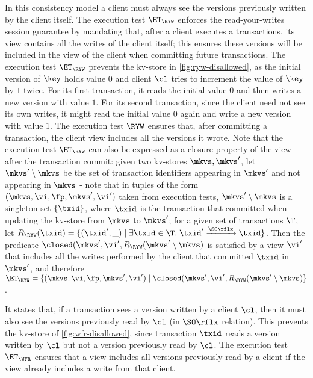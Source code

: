 In this consistency model a client must always see the versions previously written by the client itself. 
The execution test $\ET_{\RYW}$ enforces the read-your-writes session guarantee by 
mandating that, after a client executes a transactions, its view contains all the writes of the client 
itself; this ensures these versions will be included in the view of the client when committing future 
transactions.
The execution test $\ET_{\RYW}$ prevents the kv-store in \cref{fig:ryw-disallowed}, 
as the initial version of $\key$ holds value $0$ 
and client $\cl$ tries to increment the value of $\key$ by $1$ twice.  
For its first transaction, it reads the initial value $0$ and then writes a new version with value $1$. 
For its second transaction, since the client need not see its own writes, 
it might read the initial value $0$ again and write a new version with value $1$.
The execution test $\RYW$ ensures that, after committing a transaction, 
the client view includes all the versions it wrote.  
Note that the execution test $\ET_{\RYW}$ can also be expressed 
as a closure property of the view after the transaction commit: given 
two kv-stores $\mkvs, \mkvs'$, let  
$\mkvs' \setminus \mkvs$ be the set of transaction identifiers appearing 
in $\mkvs'$ and not appearing in $\mkvs$ - note that in tuples of the form 
$(\mkvs, \vi, \fp, \mkvs', \vi')$ taken from execution tests, $\mkvs' \setminus \mkvs$ 
is a singleton set $\{\txid\}$, where $\txid$ is the transaction that committed 
when updating the kv-store from $\mkvs$ to $\mkvs'$; for a given 
set of transactions $\T$, let $R_{\RYW}(\txid) = \{(\txid', \_) \mid \exists \txid \in \T.\; \txid' \xrightarrow{\SO\rflx} \txid\}$. 
Then the predicate $\closed(\mkvs', \vi', R_{\RYW}(\mkvs' \setminus \mkvs)$ is satisfied by a 
view $\vi'$ that includes all the writes performed by the client that committed $\txid$ in $\mkvs'$, 
and therefore $\ET_{\RYW} = \{(\mkvs, \vi, \fp, \mkvs', \vi') \mid \closed(\mkvs', \vi', R_{\RYW}(\mkvs' \setminus \mkvs)\}$.
 


It states that, if a transaction sees a version written by a
client $\cl$, then it must also see the versions previously read by $\cl$ (in $\SO\rflx$ relation).
This prevents the kv-store of \cref{fig:wfr-disallowed},
since transaction $\txid$ reads a version written by $\cl$ but
not a version previously read by $\cl$.
The execution test $\ET_{\WFR}$ ensures
that a view includes all versions previously read by a client 
if the view already includes a write from that client. 

